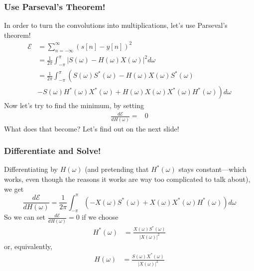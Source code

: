 \begin{frame}
  \frametitle{Use Parseval's Theorem!}

  In order to turn the convolutions into multiplications, let's use
  Parseval's theorem!
  \begin{align*}
    {\mathcal E}&=\sum_{n=-\infty}^\infty \left(s[n]-y[n]\right)^2\\
    &=\frac{1}{2\pi}\int_{-\pi}^\pi \left|S(\omega)-H(\omega)X(\omega)\right|^2 d\omega\\
    &=\frac{1}{2\pi}\int_{-\pi}^\pi \left(S(\omega)S^*(\omega)-H(\omega)X(\omega)S^*(\omega)\right.\\
    &\left.-S(\omega)H^*(\omega)X^*(\omega)+H(\omega)X(\omega)X^*(\omega)H^*(\omega)\right)d\omega
  \end{align*}
  Now let's try to find the minimum, by setting
  \begin{align*}
    \frac{d{\mathcal E}}{dH(\omega)}=&0
  \end{align*}
  What does that become?  Let's find out on the next slide!
\end{frame}
  

\begin{frame}
  \frametitle{Differentiate and Solve!}
  
  Differentiating by $H(\omega)$ (and pretending that $H^*(\omega)$
  stays constant---which works, even though the reasons it works are
  way too complicated to talk about), we get
  \begin{displaymath}
    \frac{d{\mathcal E}}{dH(\omega)}
    =\frac{1}{2\pi}\int_{-\pi}^\pi \left(-X(\omega)S^*(\omega)+
    X(\omega)X^*(\omega)H^*(\omega)\right)d\omega
  \end{displaymath}
  So we can set $\frac{d{\mathcal E}}{dH(\omega)}=0$ if we choose
  \begin{align*}
    H^*(\omega)&=\frac{X(\omega)S^*(\omega)}{|X(\omega)|^2}
  \end{align*}
  or, equivalently, 
  \begin{align*}
    H(\omega)&=\frac{S(\omega)X^*(\omega)}{|X(\omega)|^2}
  \end{align*}
\end{frame}

